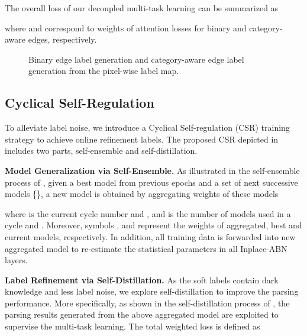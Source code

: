 \documentclass[10pt,twocolumn,letterpaper]{article}
\begin{document}
The overall loss of our decoupled multi-task learning can be summarized as
\small

\normalsize
where  and  correspond to weights of attention losses for binary and category-aware edges, respectively.

\begin{figure}
\centering
{}
\vspace{-2.5mm}
\caption{Binary edge label generation and category-aware edge label generation from the pixel-wise label map.}
\vspace{-4mm}
\label{fig:edgegeneration}
\end{figure}

\subsection{Cyclical Self-Regulation}

To alleviate label noise, we introduce a Cyclical Self-regulation (CSR) training strategy to achieve online refinement labels. The proposed CSR depicted in \figureautorefname{ \ref{fig:framwork}} includes two parts, self-ensemble  and self-distillation.
 
\noindent\textbf{Model Generalization via Self-Ensemble.}  As illustrated in the self-ensemble process of \figureautorefname{ \ref{fig:framwork}}, given a best model  from previous epochs and a set of next successive models \{\}, a new model is obtained by aggregating weights of these models

where  is the current cycle number and , and  is the number of models used in a cycle and . Moreover, symbols ,  and  represent the weights of aggregated, best and current models, respectively. In addition, all training data is forwarded into new aggregated model to re-estimate the statistical parameters in all Inplace-ABN \cite{inplace} layers.   

\noindent\textbf{Label Refinement via Self-Distillation.} 
As the soft labels contain dark knowledge \cite{Hinton2015DistillingTK} and less label noise, we explore self-distillation to improve the parsing performance. More specifically, as shown in the self-distillation process of \figureautorefname{ \ref{fig:framwork}}, the parsing results generated from the above aggregated model are exploited to supervise the multi-task learning. The total weighted loss is defined as  
 
\end{document}
